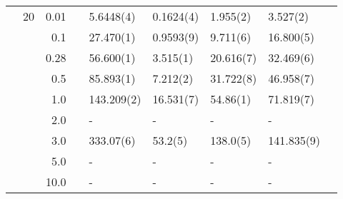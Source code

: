 \begin{table}[H]
\begin{tabularx}{\textwidth}{R{1cm}rrcR{2.3cm}R{2.3cm}R{2.3cm}R{2.3cm}R{1cm}}
		&20 & 0.01 && 5.6448(4) & 0.1624(4) & 1.955(2) & 3.527(2) \\
		&& 0.1 && 27.470(1) & 0.9593(9) & 9.711(6) & 16.800(5) \\
		&& 0.28 && 56.600(1) & 3.515(1) & 20.616(7) & 32.469(6) \\
		&& 0.5 && 85.893(1) & 7.212(2) & 31.722(8) & 46.958(7) \\
		&& 1.0 && 143.209(2) & 16.531(7) & 54.86(1) & 71.819(7) \\
		&& 2.0 && - & - & - & -\\
		&& 3.0 && 333.07(6) & 53.2(5) & 138.0(5) & 141.835(9) \\ 
		&& 5.0 && - & - & - & -\\
		&& 10.0 && - & - & - & -\\
		\hline \hline
	\end{tabularx}
\end{table}

